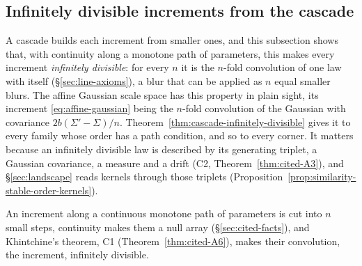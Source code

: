 \subsection{Infinitely divisible increments from the cascade}\label{sec:null-array}

A cascade builds each increment from smaller ones, and this subsection shows that, with continuity
along a monotone path of parameters, this makes every increment \emph{infinitely divisible}: for every $n$ it is the $n$-fold convolution of one law
with itself (\S\ref{sec:line-axioms}), a blur that can be applied as $n$ equal smaller blurs. The
affine Gaussian scale space has this property in plain sight, its increment
\ref{eq:affine-gaussian} being the $n$-fold convolution of the Gaussian with covariance
$2b(\Sigma' - \Sigma)/n$. Theorem~\ref{thm:cascade-infinitely-divisible} gives it to every family
whose order has a path condition, and so to every corner. It matters because an infinitely divisible
law is described by its generating triplet, a Gaussian covariance, a \Levy{} measure and a drift
(C2, Theorem~\ref{thm:cited-A3}), and \S\ref{sec:landscape} reads kernels through those triplets
(Proposition~\ref{prop:similarity-stable-order-kernels}).

An increment along a continuous monotone path of parameters is cut into $n$ small steps, continuity
makes them a null array (\S\ref{sec:cited-facts}), and Khintchine's theorem, C1
(Theorem~\ref{thm:cited-A6}), makes their convolution, the increment, infinitely divisible.

